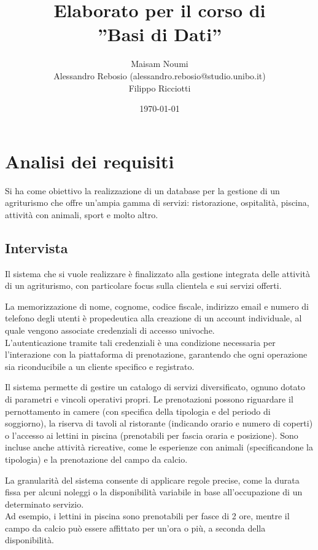 \documentclass[a4paper,11pt]{report}
\title{Elaborato per il corso di\\''Basi di Dati''}
\author{
    Maisam Noumi \\
    Alessandro Rebosio (alessandro.rebosio@studio.unibo.it)\\
    Filippo Ricciotti
}
\date{\today}
\begin{document}
\maketitle

\tableofcontents

\chapter{Analisi dei requisiti}
Si ha come obiettivo la realizzazione di un database per la gestione di un agriturismo che offre un'ampia gamma di servizi: ristorazione,
ospitalità, piscina, attività con animali, sport e molto altro.

\section{Intervista}
Il sistema che si vuole realizzare è finalizzato alla gestione integrata delle attività di un agriturismo, con particolare focus sulla clientela e sui servizi offerti.

La memorizzazione di nome, cognome, codice fiscale, indirizzo email e numero di telefono degli utenti è propedeutica alla creazione di un account individuale, 
al quale vengono associate credenziali di accesso univoche. 
\\L'autenticazione tramite tali credenziali è una condizione necessaria per l'interazione con la piattaforma di prenotazione, 
garantendo che ogni operazione sia riconducibile a un cliente specifico e registrato.

Il sistema permette di gestire un catalogo di servizi diversificato, ognuno dotato di parametri e vincoli operativi propri. 
Le prenotazioni possono riguardare il pernottamento in camere (con specifica della tipologia e del periodo di soggiorno), la riserva di tavoli al ristorante (indicando orario e numero di coperti) o l'accesso ai lettini in piscina (prenotabili per fascia oraria e posizione). 
Sono incluse anche attività ricreative, come le esperienze con animali (specificandone la tipologia) e la prenotazione del campo da calcio.

La granularità del sistema consente di applicare regole precise, come la durata fissa per alcuni noleggi o la disponibilità variabile in base all'occupazione di un determinato servizio. 
\\Ad esempio, i lettini in piscina sono prenotabili per fasce di 2 ore, mentre il campo da calcio può essere affittato per un'ora o più, a seconda della disponibilità.
\end{document}

